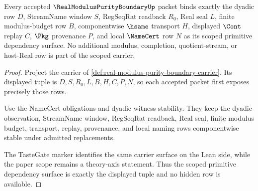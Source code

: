 \begin{theorem}
\label{thm:real-modulus-purity-boundary-scope-binding}
Every accepted $\RealModulusPurityBoundaryUp$ packet binds exactly the dyadic row $D$, StreamName window $S$, RegSeqRat readback $R_0$, Real seal $L$, finite modulus-budget row $B$, componentwise $\hsame$ transport $H$, displayed $\Cont$ replay $C$, $\Pkg$ provenance $P$, and local $\NameCert$ row $N$ as its scoped primitive dependency surface. No additional modulus, completion, quotient-stream, or host-Real row is part of the scoped carrier.
\end{theorem}
\begin{proof}
Project the carrier of \autoref{def:real-modulus-purity-boundary-carrier}. Its displayed tuple is $D,S,R_0,L,B,H,C,P,N$, so each accepted packet first exposes precisely those rows.

Use the NameCert obligations and dyadic witness stability. They keep the dyadic observation, StreamName window, RegSeqRat readback, Real seal, finite modulus budget, transport, replay, provenance, and local naming rows componentwise stable under admitted replacements.

The TasteGate marker identifies the same carrier surface on the Lean side, while the paper scope remains a theory-axis statement. Thus the scoped primitive dependency surface is exactly the displayed tuple and no hidden row is available.
\end{proof}

